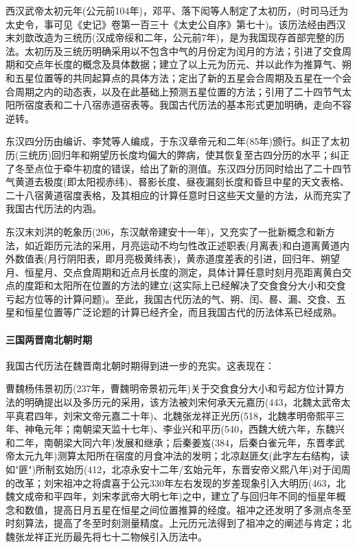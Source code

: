 西汉武帝太初元年(公元前104年)，邓平、落下闳等人制定了太初历，(时司马迁为太史令，事可见《史记》卷第一百三十《太史公自序》第七十)。该历法经由西汉末刘歆改造为三统历(汉成帝绥和二年，公元前7年)，是为我国现存首部完整的历法。太初历及三统历明确采用以不包含中气的月份定为闰月的方法；引进了交食周期和交点年长度的概念及具体数据；建立了以上元为历元、并以此作为推算气、朔和五星位置等的共同起算点的具体方法；定出了新的五星会合周期及五星在一个会合周期之内的动态表，以及在此基础上预测五星位置的方法；引用了二十四节气太阳所宿度表和二十八宿赤道宿表等。我国古代历法的基本形式更加明确，走向不容逆转。

东汉四分历由编䜣、李梵等人编成，于东汉章帝元和二年(85年)颁行。纠正了太初历(三统历)回归年和朔望历长度均偏大的弊病，使其恢复至古四分历的水平；纠正了冬至点位于牵牛初度的错误，给出了新的测值。东汉四分历同时给出了二十四节气黄道去极度(即太阳视赤纬)、晷影长度、昼夜漏刻长度和昏旦中星的天文表格、二十八宿黄道宿度表格，及其相应的计算任意时日这些天文量的方法，从而充实了我国古代历法的内涵。

东汉末刘洪的乾象历(206，东汉献帝建安十一年)，又充实了一批新概念和新方法，如近距历元法的采用，月亮运动不均匀性改正述职表(月离表)和白道离黄道内外数值表(月行阴阳表，即月亮极黄纬表)，黄赤道度差表的引进，回归年、朔望月、恒星月、交点食周期和近点月长度的测定，具体计算任意时刻月亮距离黄白交点的度距和太阳所在位置的方法的建立(这实际上已经解决了交食食分大小和交食亏起方位等的计算问题)。至此，我国古代历法的气、朔、闰、晷、漏、交食、五星和恒星位置等广泛论题的计算已经齐全，而且我国古代的历法体系已经成熟。
\paragraph{三国两晋南北朝时期}
我国古代历法在魏晋南北朝时期得到进一步的充实。这表现在：

曹魏杨伟景初历(237年，曹魏明帝景初元年)关于交食食分大小和亏起方位计算方法的明确提出以及多历元的采用，该方法被刘宋何承天元嘉历(443，北魏太武帝太平真君四年，刘宋文帝元嘉二十年)、北魏张龙祥正光历(518，北魏孝明帝熙平三年、神龟元年；南朝梁天监十七年)、李业兴和平历(540，西魏大统六年，东魏兴和二年，南朝梁大同六年)发展和继承；后秦姜岌(384，后秦白雀元年，东晋孝武帝太元九年)测算太阳所在宿度的月食冲法的发明；北凉赵匪攵(此字左右结构，读如"匪")所制玄始历(412，北凉永安十二年/玄始元年，东晋安帝义熙八年)对于闰周的改革；刘宋祖冲之将虞喜于公元330年左右发现的岁差现象引入大明历(463，北魏文成帝和平四年，刘宋孝武帝大明七年)之中，建立了与回归年不同的恒星年概念和数值，提高日月五星在恒星之间位置推算的经度。祖冲之还发明了多测点冬至时刻算法，提高了冬至时刻测量精度。上元历元法得到了祖冲之的阐述与肯定；北魏张龙祥正光历最先将七十二物候引入历法中。

